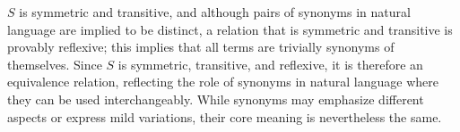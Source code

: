 $S$ is symmetric and transitive, and although pairs of
synonyms in natural language are implied to be distinct, a relation that is
symmetric and transitive is provably reflexive; this implies that all terms are
trivially synonyms of themselves. Since $S$ is symmetric, transitive, and
reflexive, it is therefore an equivalence relation, reflecting the role of
synonyms in natural language where they can be used interchangeably. While
synonyms may emphasize different aspects or express mild variations, their core
meaning is nevertheless the same.




